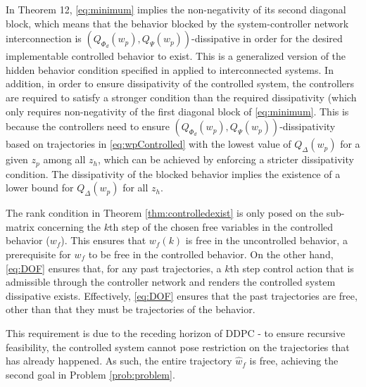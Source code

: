 \documentclass[11pt,print,draftcls,onecolumn,romanappendices]{ieeecolor}
\newcommand{\revise}[1]{{\color{black} #1}}
\begin{document}
\revise{In Theorem 12, \eqref{eq:minimum} implies the non-negativity of its second diagonal block, which means that the behavior blocked by the system-controller network interconnection is $(Q_{\Phi_d}(w_p),Q_{\Psi}(w_p))$-dissipative in order for the desired implementable controlled behavior to exist. This is a generalized version of the hidden behavior condition specified in \cite{Willems:2002} applied to interconnected systems. In addition, in order to ensure dissipativity of the controlled system, the controllers are required to satisfy a stronger condition than the required dissipativity (which only requires non-negativity of the first diagonal block of \eqref{eq:minimum}. This is because the controllers need to ensure $(Q_{\Phi_d}(w_p),Q_{\Psi}(w_p))$-dissipativity based on trajectories in \eqref{eq:wpControlled} with the lowest value of $Q_\Delta(w_p)$ for a given $z_p$ among all $z_h$, which can be achieved by enforcing a stricter dissipativity condition. The dissipativity of the blocked behavior implies the existence of a lower bound for $Q_\Delta(w_p)$ for all $z_h$.

The rank condition in Theorem \ref{thm:controlledexist} is only posed on the sub-matrix concerning the $k$th step of the chosen free variables in the controlled behavior ($w_f$). This ensures that $w_f(k)$ is free in the uncontrolled behavior, a prerequisite for $w_f$ to be free in the controlled behavior. On the other hand, \eqref{eq:DOF} ensures that, for any past trajectories, a $k$th step control action that is admissible through the controller network and renders the controlled system dissipative exists. Effectively, \eqref{eq:DOF} ensures that the past trajectories are free, other than that they must be trajectories of the behavior.} This requirement is due to the receding horizon of DDPC - \revise{to ensure recursive feasibility,} the controlled system cannot pose restriction on the trajectories that has already happened. \revise{As such, the entire trajectory $\hat{w}_f$ is free, achieving the second goal in Problem \ref{prob:problem}.}
\end{document}
